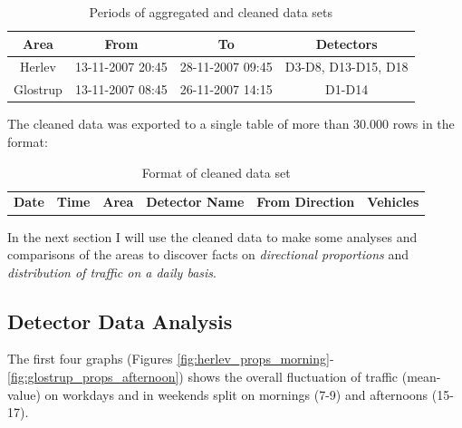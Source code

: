 \begin{table}[!ht]
\begin{center}
\begin{tabular}{c|c|c|c}
\textbf{Area} & \textbf{From} & \textbf{To} & \textbf{Detectors} \\ \hline
Herlev & 13-11-2007 20:45 & 28-11-2007 09:45 & D3-D8, D13-D15, D18 \\
Glostrup & 13-11-2007 08:45 & 26-11-2007 14:15 & D1-D14 \\
\end{tabular}
\end{center}
\caption{Periods of aggregated and cleaned data sets}
\label{tab:dataperiod}
\end{table}

The cleaned data was exported to a single table of more than 30.000 rows in the format:
\begin{table}[!ht]
\begin{center}
\begin{tabular}{c|c|c|c|c|c}
\textbf{Date} & \textbf{Time} & \textbf{Area} & \textbf{Detector Name} & \textbf{From Direction} & \textbf{Vehicles} \\
\end{tabular}
\end{center}
\caption{Format of cleaned data set}
\label{tab:cleandataformat}
\end{table}

In the next section I will use the cleaned data to make some analyses and comparisons of the areas to discover facts on \textit{directional proportions} and \textit{distribution of traffic on a daily basis}.

\subsection{Detector Data Analysis}

The first four graphs (Figures \ref{fig:herlev_props_morning}-\ref{fig:glostrup_props_afternoon}) shows the overall fluctuation of traffic (mean-value) on workdays and in weekends split on mornings (7-9) and afternoons (15-17).

